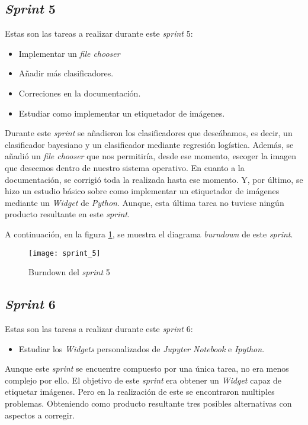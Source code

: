 \subsection{\textit{Sprint} 5}
Estas son las tareas a realizar durante este \textit{sprint} 5:

\begin{itemize}
	\item Implementar un \textit{file chooser} 
	\item Añadir más clasificadores.
	\item Correciones en la documentación.
	\item Estudiar como implementar un etiquetador de imágenes.
\end{itemize}

Durante este \textit{sprint} se añadieron los clasificadores que deseábamos, es decir, un clasificador bayesiano y un clasificador mediante regresión logística. Además, se añadió un \textit{file chooser} que nos permitiría, desde ese momento, escoger la imagen que deseemos dentro de nuestro sistema operativo. En cuanto a la documentación, se corrigió toda la  realizada hasta ese momento. Y, por último, se hizo un estudio básico sobre como implementar un etiquetador de imágenes mediante un \textit{Widget} de \textit{Python}. Aunque, esta última tarea no tuviese ningún producto resultante en este \textit{sprint}.

A continuación, en la figura \ref{fig:A.1.6}, se muestra el diagrama \textit{burndown} de este \textit{sprint}.

\begin{figure}
\centering
\texttt{[image: sprint\_5]}
\caption{Burndown del \textit{sprint} 5}
\label{fig:A.1.6}
\end{figure}

\subsection{\textit{Sprint} 6}
Estas son las tareas a realizar durante este \textit{sprint} 6:

\begin{itemize}
	\item Estudiar los \textit{Widgets} personalizados de \textit{Jupyter Notebook} e \textit{Ipython}.
\end{itemize}

Aunque este \textit{sprint} se encuentre compuesto por una única tarea, no era menos complejo por ello. El objetivo de este \textit{sprint} era obtener un \textit{Widget} capaz de etiquetar imágenes. Pero en la realización de este se encontraron multiples problemas. Obteniendo como producto resultante tres posibles alternativas con aspectos a corregir.

